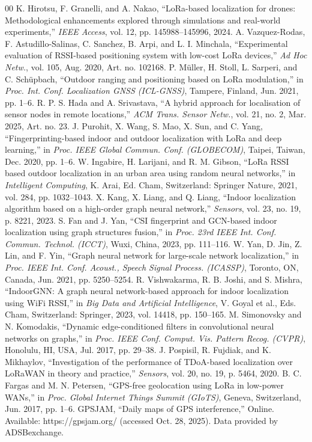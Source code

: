 \documentclass{ieeeaccess}
\begin{document}
\begin{thebibliography}{00}
 K. Hirotsu, F. Granelli, and A. Nakao, ``LoRa-based localization for drones: Methodological enhancements explored through simulations and real-world experiments,'' \emph{IEEE Access}, vol. 12, pp. 145988--145996, 2024.
 A. Vazquez-Rodas, F. Astudillo-Salinas, C. Sanchez, B. Arpi, and L. I. Minchala, ``Experimental evaluation of RSSI-based positioning system with low-cost LoRa devices,'' \emph{Ad Hoc Netw.}, vol. 105, Aug. 2020, Art. no. 102168.
 P. M\"{u}ller, H. Stoll, L. Sarperi, and C. Sch\"{u}pbach, ``Outdoor ranging and positioning based on LoRa modulation,'' in \emph{Proc. Int. Conf. Localization GNSS (ICL-GNSS)}, Tampere, Finland, Jun. 2021, pp. 1--6.
 R. P. S. Hada and A. Srivastava, ``A hybrid approach for localisation of sensor nodes in remote locations,'' \emph{ACM Trans. Sensor Netw.}, vol. 21, no. 2, Mar. 2025, Art. no. 23.
 J. Purohit, X. Wang, S. Mao, X. Sun, and C. Yang, ``Fingerprinting-based indoor and outdoor localization with LoRa and deep learning,'' in \emph{Proc. IEEE Global Commun. Conf. (GLOBECOM)}, Taipei, Taiwan, Dec. 2020, pp. 1--6.
 W. Ingabire, H. Larijani, and R. M. Gibson, ``LoRa RSSI based outdoor localization in an urban area using random neural networks,'' in \emph{Intelligent Computing}, K. Arai, Ed. Cham, Switzerland: Springer Nature, 2021, vol. 284, pp. 1032--1043.
 X. Kang, X. Liang, and Q. Liang, ``Indoor localization algorithm based on a high-order graph neural network,'' \emph{Sensors}, vol. 23, no. 19, p. 8221, 2023.
 S. Fan and J. Yan, ``CSI fingerprint and GCN-based indoor localization using graph structures fusion,'' in \emph{Proc. 23rd IEEE Int. Conf. Commun. Technol. (ICCT)}, Wuxi, China, 2023, pp. 111--116.
 W. Yan, D. Jin, Z. Lin, and F. Yin, ``Graph neural network for large-scale network localization,'' in \emph{Proc. IEEE Int. Conf. Acoust., Speech Signal Process. (ICASSP)}, Toronto, ON, Canada, Jun. 2021, pp. 5250--5254.
 R. Vishwakarma, R. B. Joshi, and S. Mishra, ``IndoorGNN: A graph neural network-based approach for indoor localization using WiFi RSSI,'' in \emph{Big Data and Artificial Intelligence}, V. Goyal et al., Eds. Cham, Switzerland: Springer, 2023, vol. 14418, pp. 150--165.
 M. Simonovsky and N. Komodakis, ``Dynamic edge-conditioned filters in convolutional neural networks on graphs,'' in \emph{Proc. IEEE Conf. Comput. Vis. Pattern Recog. (CVPR)}, Honolulu, HI, USA, Jul. 2017, pp. 29--38.
 J. Pospisil, R. Fujdiak, and K. Mikhaylov, ``Investigation of the performance of TDoA-based localization over LoRaWAN in theory and practice,'' \emph{Sensors}, vol. 20, no. 19, p. 5464, 2020.
 B. C. Fargas and M. N. Petersen, ``GPS-free geolocation using LoRa in low-power WANs,'' in \emph{Proc. Global Internet Things Summit (GIoTS)}, Geneva, Switzerland, Jun. 2017, pp. 1--6.
 GPSJAM, ``Daily maps of GPS interference,'' Online. Available: https://gpsjam.org/ (accessed Oct. 28, 2025). Data provided by ADSBexchange.
\end{thebibliography}
\end{document}
